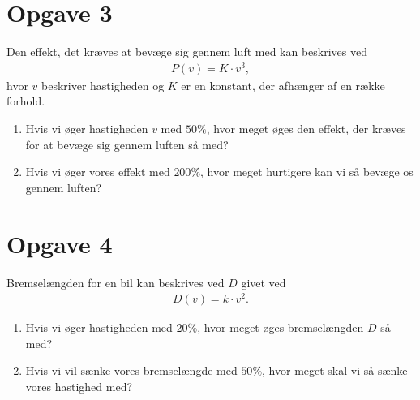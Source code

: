 \documentclass[12pt]{article}
\begin{document}
\section*{Opgave 3}
Den effekt, det kræves at bevæge sig gennem luft med kan beskrives ved 
\begin{align*}
P(v) = K\cdot v^3,
\end{align*}
hvor $v$ beskriver hastigheden og $K$ er en konstant, der afhænger af en række forhold.
\begin{enumerate}[label=\roman*)]
\item Hvis vi øger hastigheden $v$ med $50\%$, hvor meget øges den effekt, der kræves for at bevæge sig gennem luften så med? 
\item Hvis vi øger vores effekt med $200\%$, hvor meget hurtigere kan vi så bevæge os gennem luften?
\end{enumerate}
\section*{Opgave 4}
Bremselængden for en bil kan beskrives ved $D$ givet ved
\begin{align*}
D(v) = k\cdot v^2.
\end{align*}
\begin{enumerate}[label=\roman*)]
\item Hvis vi øger hastigheden med $20\%$, hvor meget øges bremselængden $D$ så med?
\item Hvis vi vil sænke vores bremselængde med $50\%$, hvor meget skal vi så sænke vores hastighed med?
\end{enumerate}
\end{document}
